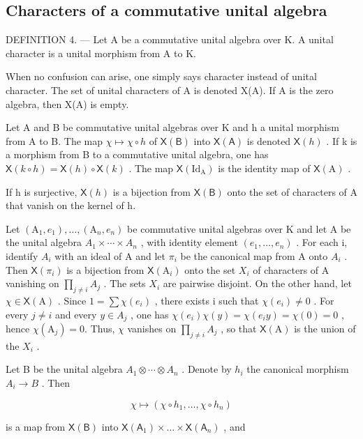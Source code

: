 \subsection{Characters of a commutative unital algebra}

DEFINITION 4. --- Let A be a commutative unital algebra over K. A unital character is a unital morphism from A to K.

When no confusion can arise, one simply says character instead of unital character. The set of unital characters of A is denoted X(A). If A is the zero algebra, then X(A) is empty.

Let A and B be commutative unital algebras over K and h a unital morphism from A to B. The map \(\chi \mapsto \chi \circ h\) of \(\mathsf{X}(\mathsf{B})\) into \(\mathsf{X}(\mathsf{A})\) is denoted \(\mathsf{X}(h)\) . If k is a morphism from B to a commutative unital algebra, one has \(\mathsf{X}(k \circ h) = \mathsf{X}(h) \circ \mathsf{X}(k)\) . The map \(\mathsf{X}(\mathrm{Id}_{\mathrm{A}})\) is the identity map of \(\mathsf{X}(\mathrm{A})\) .

If h is surjective, \(\mathsf{X}(h)\) is a bijection from \(\mathsf{X}(\mathsf{B})\) onto the set of characters of A that vanish on the kernel of h.

Let \((\mathrm{A}_{1},e_{1}),\ldots,(\mathrm{A}_{n},e_{n})\) be commutative unital algebras over K and let A be the unital algebra \(A_{1}\times\cdots\times A_{n}\) , with identity element \((e_{1},\ldots,e_{n})\) . For each i, identify \(A_{i}\) with an ideal of A and let \(\pi_{i}\) be the canonical map from A onto \(A_{i}\) . Then \(\mathsf{X}(\pi_{i})\) is a bijection from \(\mathsf{X}(\mathrm{A}_{i})\) onto the set \(X_{i}\) of characters of A vanishing on \(\prod_{j\neq i}A_{j}\) . The sets \(X_{i}\) are pairwise disjoint. On the other hand, let \(\chi\in\mathsf{X}(\mathrm{A})\) . Since \(1=\sum\chi(e_{i})\) , there exists i such that \(\chi(e_{i})\neq0\) . For every \(j\neq i\) and every \(y\in A_{j}\) , one has \(\chi(e_{i})\chi(y)=\chi(e_{i}y)=\chi(0)=0\) , hence \(\chi(\mathrm{A}_{j})=0\). Thus, \(\chi\) vanishes on \(\prod_{j\neq i}A_{j}\) , so that \(\mathsf{X}(\mathrm{A})\) is the union of the \(X_{i}\) .

Let B be the unital algebra \(A_{1} \otimes \cdots \otimes A_{n}\) . Denote by \(h_{i}\) the canonical morphism \(A_{i} \to B\) . Then

\[
\chi \mapsto (\chi \circ h _ {1}, \dots , \chi \circ h _ {n})
\]

is a map from \(\mathsf{X}(\mathsf{B})\) into \(\mathsf{X}(\mathsf{A}_1)\times \dots \times \mathsf{X}(\mathsf{A}_n)\) , and

